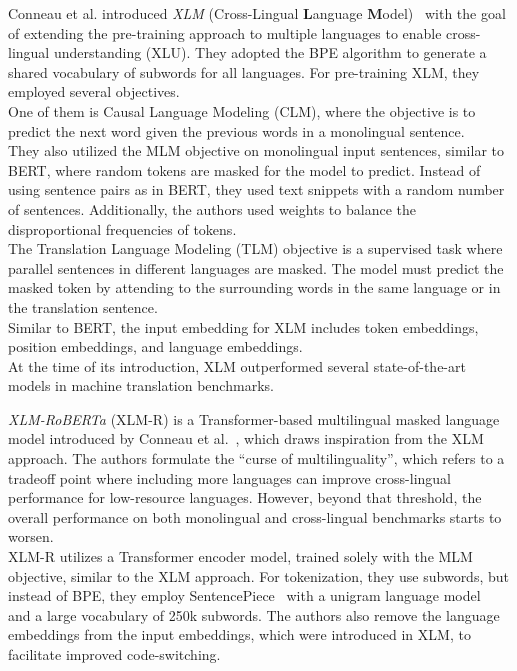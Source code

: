 Conneau et al. introduced \textit{XLM} (Cross-Lingual \textbf{L}anguage \textbf{M}odel)~\cite{conneau2019cross} with the goal of extending the pre-training approach to multiple languages to enable cross-lingual understanding (XLU). They adopted the BPE algorithm to generate a shared vocabulary of subwords for all languages. For pre-training XLM, they employed several objectives.\\
One of them is Causal Language Modeling (CLM), where the objective is to predict the next word given the previous words in a monolingual sentence.\\
They also utilized the MLM objective on monolingual input sentences, similar to BERT, where random tokens are masked for the model to predict. Instead of using sentence pairs as in BERT, they used text snippets with a random number of sentences. Additionally, the authors used weights to balance the disproportional frequencies of tokens.\\
The Translation Language Modeling (TLM) objective is a supervised task where parallel sentences in different languages are masked. The model must predict the masked token by attending to the surrounding words in the same language or in the translation sentence.\\
Similar to BERT, the input embedding for XLM includes token embeddings, position embeddings, and language embeddings.\\
At the time of its introduction, XLM outperformed several state-of-the-art models in machine translation benchmarks.\par
\textit{XLM-RoBERTa} (XLM-R) is a Transformer-based multilingual masked language model introduced by Conneau et al.~\cite{conneau2019unsupervised}, which draws inspiration from the XLM approach. The authors formulate the \enquote{curse of multilinguality}, which refers to a tradeoff point where including more languages can improve cross-lingual performance for low-resource languages. However, beyond that threshold, the overall performance on both monolingual and cross-lingual benchmarks starts to worsen.\\
XLM-R utilizes a Transformer encoder model, trained solely with the MLM objective, similar to the XLM approach. For tokenization, they use subwords, but instead of BPE, they employ SentencePiece~\cite{kudo2018sentencepiece} with a unigram language model~\cite{kudo2018subword} and a large vocabulary of 250k subwords. The authors also remove the language embeddings from the input embeddings, which were introduced in XLM, to facilitate improved code-switching.\\
